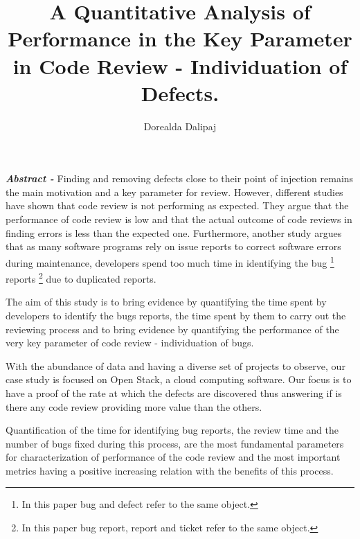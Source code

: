 \documentclass[ifip]{svmult}
\begin{document}
\title*{A Quantitative Analysis of Performance in the Key Parameter in Code Review - Individuation of Defects.}
\author{Dorealda Dalipaj}
%
%
\maketitle

\textbf{\textit{Abstract -}} Finding and removing defects close to their point of injection remains the main motivation and a key parameter
for review. However, different studies have shown that code review is not performing as expected. They argue that the performance of 
code review is low and that the actual outcome of code reviews in finding errors is less than the expected one. 
Furthermore, another study argues that as many software programs rely on issue reports to correct software errors during maintenance, 
developers spend too much time in identifying the bug
\footnote{In this paper bug and defect refer to the same object.} 
reports
\footnote{In this paper bug report, report and ticket refer to the same object.} 
due to duplicated reports.

The aim of this study is to bring evidence by quantifying the time spent by developers to identify the bugs reports, the time
spent by them to carry out the reviewing process and to bring evidence by quantifying the performance of the very key 
parameter of code review - individuation of bugs.

With the abundance of data and having a diverse set of projects to observe, our case study is focused on 
Open Stack, a cloud computing software. 
Our focus is to have a proof of the rate at which the defects are discovered 
thus answering if is there any code review providing more value than the others. 

Quantification of the time for identifying bug reports, the review time and the number of bugs fixed during this process, 
are the most fundamental parameters for characterization of performance of the code review and the most important metrics having 
a positive increasing relation with the benefits of this process.
\end{document}

